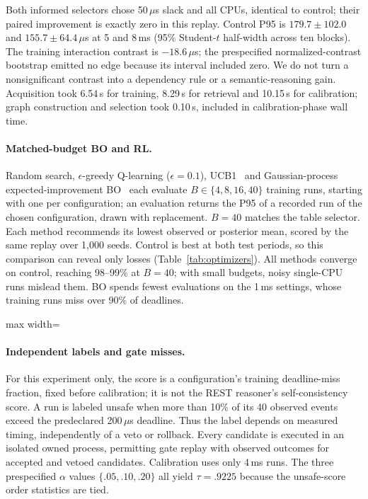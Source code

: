 Both informed selectors chose 50\,$\mu$s slack and all CPUs, identical to control; their paired improvement is exactly zero in this replay. Control P95 is $179.7\pm102.0$ and $155.7\pm64.4\,\mu$s at 5 and 8\,ms (95\% Student-$t$ half-width across ten blocks). The training interaction contrast is $-18.6\,\mu$s; the prespecified normalized-contrast bootstrap emitted no edge because its interval included zero. We do not turn a nonsignificant contrast into a dependency rule or a semantic-reasoning gain. Acquisition took 6.54\,s for training, 8.29\,s for retrieval and 10.15\,s for calibration; graph construction and selection took 0.10\,s, included in calibration-phase wall time.

\paragraph{Matched-budget BO and RL.}
Random search, $\epsilon$-greedy Q-learning ($\epsilon=0.1$), UCB1~\cite{Auer2002UCB} and Gaussian-process expected-improvement BO~\cite{Snoek2012BO} each evaluate $B\in\{4,8,16,40\}$ training runs, starting with one per configuration; an evaluation returns the P95 of a recorded run of the chosen configuration, drawn with replacement. $B=40$ matches the table selector. Each method recommends its lowest observed or posterior mean, scored by the same replay over 1,000 seeds. Control is best at both test periods, so this comparison can reveal only losses (Table~\ref{tab:optimizers}). All methods converge on control, reaching 98--99\% at $B=40$; with small budgets, noisy single-CPU runs mislead them. BO spends fewest evaluations on the 1\,ms settings, whose training runs miss over 90\% of deadlines.

\begin{table}[t]
\centering\footnotesize\setlength{\tabcolsep}{2pt}
\caption{Matched-budget replay: \% of 1,000 seeds choosing control\,/\,expected paired P95 change at 5\,ms (\%); last column: mean training evaluations of 1\,ms settings at $B=40$.}
\label{tab:optimizers}
\begin{adjustbox}{max width=\columnwidth}

\end{adjustbox}
\end{table}

\paragraph{Independent labels and gate misses.}
For this experiment only, the score is a configuration's training deadline-miss fraction, fixed before calibration; it is not the REST reasoner's self-consistency score. A run is labeled unsafe when more than 10\% of its 40 observed events exceed the predeclared 200\,$\mu$s deadline. Thus the label depends on measured timing, independently of a veto or rollback. Every candidate is executed in an isolated owned process, permitting gate replay with observed outcomes for accepted and vetoed candidates. Calibration uses only 4\,ms runs. The three prespecified $\alpha$ values $\{.05,.10,.20\}$ all yield $\tau=.9225$ because the unsafe-score order statistics are tied.

